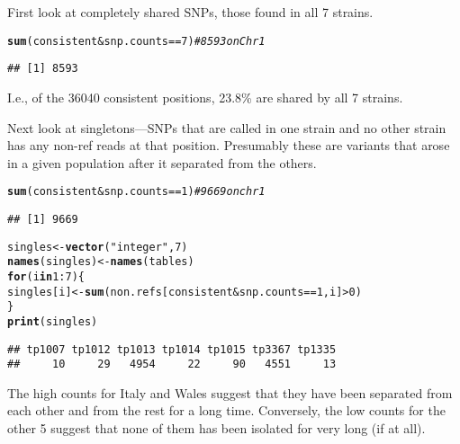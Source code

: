 \documentclass{article}\usepackage[]{graphicx}\usepackage[]{color}
\makeatletter
\newcommand{\hlnum}[1]{\textcolor[rgb]{0.686,0.059,0.569}{#1}}%
\newcommand{\hlstr}[1]{\textcolor[rgb]{0.192,0.494,0.8}{#1}}%
\newcommand{\hlcom}[1]{\textcolor[rgb]{0.678,0.584,0.686}{\textit{#1}}}%
\newcommand{\hlopt}[1]{\textcolor[rgb]{0,0,0}{#1}}%
\newcommand{\hlstd}[1]{\textcolor[rgb]{0.345,0.345,0.345}{#1}}%
\newcommand{\hlkwa}[1]{\textcolor[rgb]{0.161,0.373,0.58}{\textbf{#1}}}%
\newcommand{\hlkwb}[1]{\textcolor[rgb]{0.69,0.353,0.396}{#1}}%
\newcommand{\hlkwd}[1]{\textcolor[rgb]{0.737,0.353,0.396}{\textbf{#1}}}%
\newenvironment{kframe}{%
 \def\at@end@of@kframe{}%
 \ifinner\ifhmode%
  \def\at@end@of@kframe{\end{minipage}}%
  \begin{minipage}{\columnwidth}%
 \fi\fi%
 \def\FrameCommand##1{\hskip\@totalleftmargin \hskip-\fboxsep
 \colorbox{shadecolor}{##1}\hskip-\fboxsep
     \hskip-\linewidth \hskip-\@totalleftmargin \hskip\columnwidth}%
 \MakeFramed {\advance\hsize-\width
   \@totalleftmargin\z@ \linewidth\hsize
   \@setminipage}}%
 {\par\unskip\endMakeFramed%
 \at@end@of@kframe}
\newenvironment{knitrout}{}{} %
\makeatother
\begin{document}
First look at completely shared SNPs, those found in all 7 strains.
\begin{knitrout}\small
{}\color{fgcolor}\begin{kframe}
\begin{alltt}
\hlkwd{sum}\hlstd{(consistent} \hlopt{&} \hlstd{snp.counts} \hlopt{==} \hlnum{7}\hlstd{)}  \hlcom{# 8593 on Chr1}
\end{alltt}
\begin{verbatim}
## [1] 8593
\end{verbatim}
\end{kframe}
\end{knitrout}

I.e., of the 36040 consistent positions, 23.8\% are
shared by all 7 strains.

Next look at singletons---SNPs that are called in one strain and no other strain has any non-ref reads at that
position. Presumably these are variants that arose in a given population after it separated from the others.
\begin{knitrout}\small
{}\color{fgcolor}\begin{kframe}
\begin{alltt}
\hlkwd{sum}\hlstd{(consistent} \hlopt{&} \hlstd{snp.counts} \hlopt{==} \hlnum{1}\hlstd{)}  \hlcom{#  9669 on chr1}
\end{alltt}
\begin{verbatim}
## [1] 9669
\end{verbatim}
\begin{alltt}
\hlstd{singles} \hlkwb{<-} \hlkwd{vector}\hlstd{(}\hlstr{"integer"}\hlstd{,} \hlnum{7}\hlstd{)}
\hlkwd{names}\hlstd{(singles)} \hlkwb{<-} \hlkwd{names}\hlstd{(tables)}
\hlkwa{for} \hlstd{(i} \hlkwa{in} \hlnum{1}\hlopt{:}\hlnum{7}\hlstd{) \{}
    \hlstd{singles[i]} \hlkwb{<-} \hlkwd{sum}\hlstd{(non.refs[consistent} \hlopt{&} \hlstd{snp.counts} \hlopt{==} \hlnum{1}\hlstd{, i]} \hlopt{>} \hlnum{0}\hlstd{)}
\hlstd{\}}
\hlkwd{print}\hlstd{(singles)}
\end{alltt}
\begin{verbatim}
## tp1007 tp1012 tp1013 tp1014 tp1015 tp3367 tp1335 
##     10     29   4954     22     90   4551     13
\end{verbatim}
\end{kframe}
\end{knitrout}

The high counts for Italy and Wales suggest that they have been separated from each other and from the rest for a long
time.  Conversely, the low counts for the other 5 suggest that none of them has been isolated for very long (if at
all).
\end{document}
